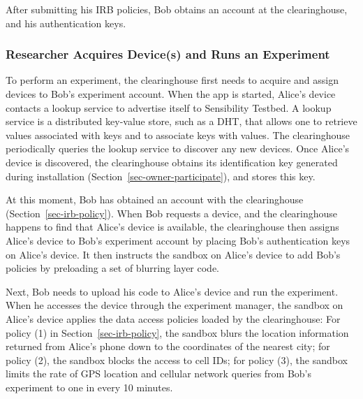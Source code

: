 After submitting his IRB policies, Bob obtains an account at the
clearinghouse, and his authentication keys. 

\subsubsection{Researcher Acquires Device(s) and Runs an
Experiment}\label{sec-acquire-run}

To perform an experiment, the clearinghouse first needs to 
acquire and assign devices to Bob's experiment account. 
When the app is started, Alice's device contacts a lookup service to 
advertise itself to Sensibility Testbed. 
A lookup service is a distributed key-value store, such as a DHT, that 
allows one to retrieve values associated with keys and to associate 
keys with values. The clearinghouse periodically queries the lookup service to
discover any new devices. Once Alice's device is discovered, the
clearinghouse obtains its identification key  generated
during installation (Section~\ref{sec-owner-participate}), and stores 
this key. 

At this moment,  Bob has obtained an account with the clearinghouse 
(Section~\ref{sec-irb-policy}).
When Bob requests a device, and the clearinghouse
happens to find that Alice's device is available, the clearinghouse then 
assigns Alice's device to Bob's experiment account by placing Bob's
authentication keys on Alice's device. It then instructs 
the sandbox on Alice's device to add Bob's policies by preloading
a set of blurring layer code.

Next, Bob needs to upload his code to Alice's device and 
run the experiment. When he accesses the device through
the experiment manager, the sandbox on Alice's device 
applies the data access policies loaded by the clearinghouse: For policy (1) in
Section~\ref{sec-irb-policy}, the sandbox blurs the location
information returned from Alice's phone down to the coordinates
of the nearest city; for policy (2), the sandbox blocks the
access to cell IDs; for policy (3), the sandbox limits the rate
of GPS location and cellular network queries from Bob's
experiment to one in every 10 minutes.

